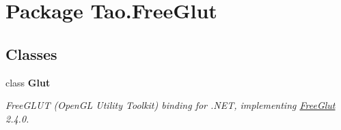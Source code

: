 \hypertarget{namespace_tao_1_1_free_glut}{
\section{Package Tao.FreeGlut}
\label{namespace_tao_1_1_free_glut}
}
\subsection*{Classes}
\begin{DoxyCompactItemize}
\item 
class {\bfseries Glut}
\begin{DoxyCompactList}\small\item\em FreeGLUT (OpenGL Utility Toolkit) binding for .NET, implementing \hyperlink{namespace_tao_1_1_free_glut}{FreeGlut} 2.4.0. \item\end{DoxyCompactList}\end{DoxyCompactItemize}
